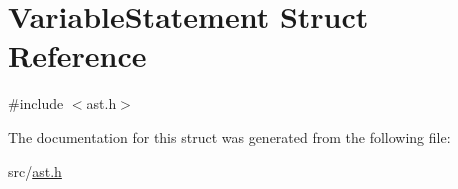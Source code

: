 \hypertarget{struct_variable_statement}{}\section{Variable\+Statement Struct Reference}
\label{struct_variable_statement}


{\ttfamily \#include $<$ast.\+h$>$}



The documentation for this struct was generated from the following file\+:\begin{DoxyCompactItemize}
\item 
src/\hyperlink{ast_8h}{ast.\+h}\end{DoxyCompactItemize}
